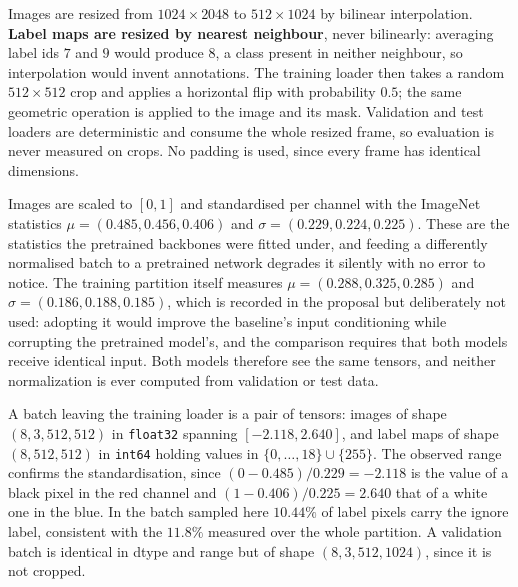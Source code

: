 Images are resized from $1024 \times 2048$ to $512 \times 1024$ by bilinear interpolation.
\textbf{Label maps are resized by nearest neighbour}, never bilinearly: averaging label ids
$7$ and $9$ would produce $8$, a class present in neither neighbour, so interpolation would
invent annotations. The training loader then takes a random $512 \times 512$ crop and applies a
horizontal flip with probability $0.5$; the same geometric operation is applied to the image and
its mask. Validation and test loaders are deterministic and consume the whole resized frame, so
evaluation is never measured on crops. No padding is used, since every frame has identical
dimensions.

Images are scaled to $[0,1]$ and standardised per channel with the ImageNet statistics
$\mu = (0.485, 0.456, 0.406)$ and $\sigma = (0.229, 0.224, 0.225)$. These are the statistics the
pretrained backbones were fitted under, and feeding a differently normalised batch to a
pretrained network degrades it silently with no error to notice. The training partition itself
measures $\mu = (0.288, 0.325, 0.285)$ and $\sigma = (0.186, 0.188, 0.185)$, which is recorded in
the proposal but deliberately not used: adopting it would improve the baseline's input
conditioning while corrupting the pretrained model's, and the comparison requires that both
models receive identical input. Both models therefore see the same tensors, and neither
normalization is ever computed from validation or test data.

A batch leaving the training loader is a pair of tensors: images of shape $(8, 3, 512, 512)$ in
\texttt{float32} spanning $[-2.118, 2.640]$, and label maps of shape $(8, 512, 512)$ in
\texttt{int64} holding values in $\{0,\dots,18\} \cup \{255\}$. The observed range confirms the
standardisation, since $(0 - 0.485)/0.229 = -2.118$ is the value of a black pixel in the red
channel and $(1 - 0.406)/0.225 = 2.640$ that of a white one in the blue. In the batch sampled
here $10.44\%$ of label pixels carry the ignore label, consistent with the $11.8\%$ measured over
the whole partition. A validation batch is identical in dtype and range but of shape
$(8, 3, 512, 1024)$, since it is not cropped.

